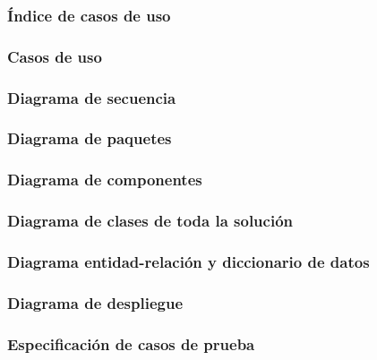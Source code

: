 \subsubsection{Índice de casos de uso}
\subsubsection{Casos de uso}


\iftfi


\fi
\subsubsection{Diagrama de secuencia}
\subsubsection{Diagrama de paquetes}
\subsubsection{Diagrama de componentes}
\subsubsection{Diagrama de clases de toda la solución}
\subsubsection{Diagrama entidad-relación y diccionario de datos}
\subsubsection{Diagrama de despliegue}
\subsubsection{Especificación de casos de prueba}
